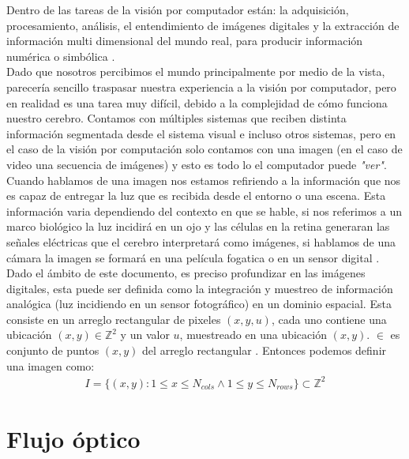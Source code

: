 \documentclass{iccmemoria}
\begin{document}
Dentro de las tareas de la visión por computador están: la adquisición, procesamiento, análisis, el entendimiento de imágenes digitales y la extracción de información multi dimensional del mundo real, para producir información numérica o simbólica \cite{klette2014concise, shapiro2001computer, morris2004computer, forsyth2003computer}.\\

Dado que nosotros percibimos el mundo principalmente por medio de la vista, parecería sencillo traspasar nuestra experiencia a la visión por computador, pero en realidad es una tarea muy difícil, debido a la complejidad de cómo funciona nuestro cerebro. Contamos con múltiples sistemas que reciben distinta información segmentada desde el sistema visual e incluso otros sistemas, pero en el caso de la visión por computación solo contamos con una imagen (en el caso de video una secuencia de imágenes) y esto es todo lo el computador puede \emph{"ver"}.\\

Cuando hablamos de una imagen nos estamos refiriendo a la información que nos es capaz de entregar la luz que es recibida desde el entorno o una escena. Esta información varia dependiendo del contexto en que se hable, si nos referimos a un marco biológico la luz incidirá en un ojo y las células en la retina generaran las señales eléctricas que el cerebro interpretará como imágenes, si hablamos de una cámara la imagen se formará en una película fogatica o en un sensor digital \cite{bradski2008learning}.\\

Dado el ámbito de este documento, es preciso profundizar en las imágenes digitales, esta puede ser definida como la integración y muestreo de información analógica (luz incidiendo en un sensor fotográfico) en un dominio espacial. Esta consiste en un arreglo rectangular de pixeles $(x, y, u)$, cada uno contiene una ubicación $(x, y) \in \mathbb{Z}^2 $ y un valor $u$, muestreado en una ubicación $(x, y)$. $\in$ es conjunto de puntos $(x, y)$ del arreglo rectangular \cite{klette2014concise}. Entonces podemos definir una imagen como:
\begin{equation}
	\begin{split}
	I = \lbrace (x, y) : 1 \leq  x \leq N_{cols} \wedge 1 \leq y \leq N_{rows} \rbrace \subset \mathbb{Z}^2
	\end{split}
\end{equation}

\section{Flujo óptico}\label{flujo_optico}
\end{document}
